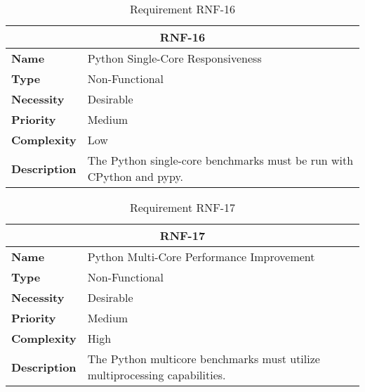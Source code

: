 \begin{table}[H]
    \centering
    \begin{tabular}{l p{10cm}}
        \toprule
        \multicolumn{2}{c}{\textbf{RNF-16}} \\
        \toprule
        \textbf{Name}         & Python Single-Core Responsiveness \\
        \textbf{Type}         & Non-Functional \\
        \textbf{Necessity}    & Desirable \\
        \textbf{Priority}     & Medium \\
        \textbf{Complexity}   & Low \\
        \textbf{Description}  & The Python single-core benchmarks must be run with \gls{CPython} and pypy. \\
        \bottomrule
    \end{tabular}
\caption{Requirement RNF-16}\label{tab:rnf-16}
\end{table}

\begin{table}[H]
    \centering
    \begin{tabular}{l p{10cm}}
        \toprule
        \multicolumn{2}{c}{\textbf{RNF-17}} \\
        \toprule
        \textbf{Name}         & Python Multi-Core Performance Improvement \\
        \textbf{Type}         & Non-Functional \\
        \textbf{Necessity}    & Desirable \\
        \textbf{Priority}     & Medium \\
        \textbf{Complexity}   & High \\
        \textbf{Description}  & The Python multicore benchmarks must utilize multiprocessing capabilities. \\
        \bottomrule
    \end{tabular}
\caption{Requirement RNF-17}\label{tab:rnf-17}
\end{table}

